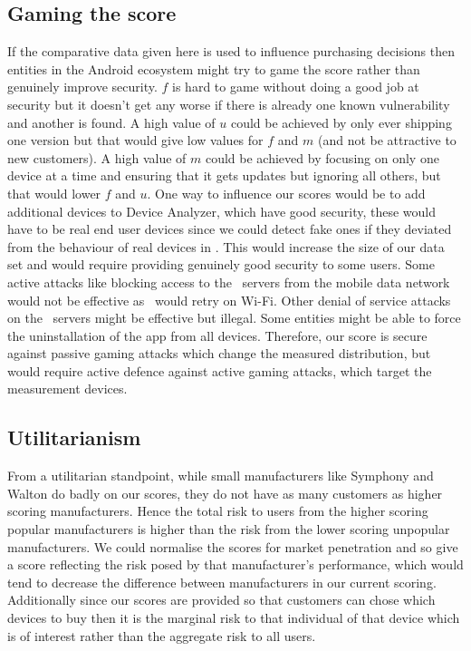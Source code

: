 \subsection{Gaming the score}\label{sec:gaming}
If the comparative data given here is used to influence purchasing decisions then entities in the Android ecosystem might try to game the score rather than genuinely improve security.
$f$ is hard to game without doing a good job at security but it doesn't get any worse if there is already one known vulnerability and another is found.
A high value of $u$ could be achieved by only ever shipping one version but that would give low values for $f$ and $m$ (and not be attractive to new customers).
A high value of $m$ could be achieved by focusing on only one device at a time and ensuring that it gets updates but ignoring all others, but that would lower $f$ and $u$.
One way to influence our scores would be to add additional devices to Device Analyzer, which have good security, these would have to be real end user devices since we could detect fake ones if they deviated from the behaviour of real devices in \da.
This would increase the size of our data set and would require providing genuinely good security to some users.
Some active attacks like blocking access to the \da\ servers from the mobile data network would not be effective as \da\ would retry on Wi-Fi.
Other denial of service attacks on the \da\ servers might be effective but illegal.
Some entities might be able to force the uninstallation of the app from all devices.
Therefore, our score is secure against passive gaming attacks which change the measured distribution, but would require active defence against active gaming attacks, which target the measurement devices.

\subsection{Utilitarianism}
From a utilitarian standpoint, while small manufacturers like Symphony and Walton do badly on our scores, they do not have as many customers as higher scoring manufacturers.
Hence the total risk to users from the higher scoring popular manufacturers is higher than the risk from the lower scoring unpopular manufacturers.
We could normalise the scores for market penetration and so give a score reflecting the risk posed by that manufacturer's performance, which would tend to decrease the difference between manufacturers in our current scoring.
Additionally since our scores are provided so that customers can chose which devices to buy then it is the marginal risk to that individual of that device which is of interest rather than the aggregate risk to all users.